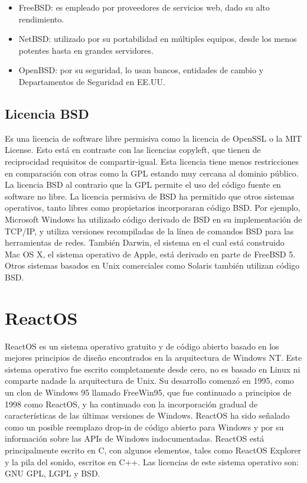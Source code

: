 \begin{itemize}
	\item FreeBSD: es empleado por proveedores de servicios web, dado su alto rendimiento.
	\item NetBSD: utilizado por su portabilidad en múltiples equipos, desde los menos potentes hasta en grandes servidores.
	\item OpenBSD: por su seguridad, lo usan bancos, entidades de cambio y Departamentos de Seguridad en EE.UU.
\end{itemize}

\subsection{Licencia BSD}
 Es una licencia de software libre permisiva como la licencia de OpenSSL o la MIT License. Esto está en contraste con las licencias copyleft, que tienen de reciprocidad requisitos de compartir-igual. Esta licencia tiene menos restricciones en comparación con otras como la GPL estando muy cercana al dominio público. La licencia BSD al contrario que la GPL permite el uso del código fuente en software no libre.
 La licencia permisiva de BSD ha permitido que otros sistemas operativos, tanto libres como propietarios incorporaran código BSD. Por ejemplo, Microsoft Windows ha utilizado código derivado de BSD en su implementación de TCP/IP, y utiliza versiones recompiladas de la línea de comandos BSD para las herramientas de redes. También Darwin, el sistema en el cual está construido Mac OS X, el sistema operativo de Apple, está derivado en parte de FreeBSD 5. Otros sistemas basados en Unix comerciales como Solaris también utilizan código BSD.
 
 
\section{ReactOS}

ReactOS es un sistema operativo gratuito y de código abierto basado en los mejores principios de diseño encontrados en la arquitectura de Windows NT. Este sistema operativo fue escrito completamente desde cero, no es basado en Linux ni comparte nadade la arquitectura de Unix.
Su desarrollo comenzó en 1995, como un clon de Windows 95 llamado FreeWin95, que fue continuado a principios de 1998 como ReactOS, y ha continuado con la incorporación gradual de características de las últimas versiones de Windows. ReactOS ha sido señalado como un posible reemplazo drop-in de código abierto para Windows y por su información sobre las APIs de Windows indocumentadas.
ReactOS está principalmente escrito en C, con algunos elementos, tales como ReactOS Explorer y la pila del sonido, escritos en C++.
Las licencias de este sistema operativo son: GNU GPL, LGPL y BSD.

